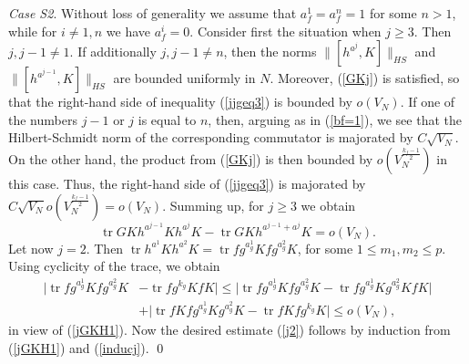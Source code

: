 \documentclass{article}
\numberwithin{equation}{section}
\newcommand{\tr}{\operatorname{tr}}
\newcommand{\fr}{\frac}
\newcommand{\lbl}{\label}
\newcommand{\bee}{\begin{equation}}
\newcommand{\eee}{\end{equation}}
\newcommand{\non}{\nonumber}
\begin{document}
{\it Case S2}.
Without loss of generality we assume that
$a_f^1=a_f^n=1$ for some $n>1$, while for $i\neq 1,n$ we have $a_f^i=0$.
Consider first the situation when $j\geq 3$. Then $j,j-1\neq 1$.
If additionally $j,j-1\neq n$, then the norms
$\|[h^{a^{j}},K]\|_{HS}$ and $\|[h^{a^{j-1}},K]\|_{HS}$
are bounded uniformly in $N$.
Moreover, (\ref{GKj}) is satisfied, so that the right-hand side of inequality (\ref{jjgeq3})
is bounded by $o(V_N)$.
If one of the numbers $j-1$ or $j$ is equal to $n$,
then, arguing as in (\ref{bf=1}),
we see that
the Hilbert-Schmidt norm of the corresponding commutator
is majorated by $C\sqrt{V_N}$.
On the other hand, the product from
(\ref{GKj}) is then bounded by $o(V_N^{\fr{k_f-1}{2}})$ in this case.
Thus, the right-hand side of  (\ref{jjgeq3})
is majorated by
$C\sqrt{V_N} o(V_N^{\fr{k_f-1}{2}})
=o(V_N).$
Summing up, for $j\geq 3$ we obtain
\bee\lbl{jGKH1}
\tr GK h^{a^{j-1}}K h^{a^j}K -\tr GK h^{a^{j-1}+a^j} K
=o(V_N).
\eee
Let now $j=2$.
Then
$\tr h^{a^1}K h^{a^2}K= \tr fg^{a_g^1}K fg^{a_g^2}K$,
for some $1\leq m_1,m_2\leq p$.
Using cyclicity of the trace, we obtain
\begin{align} \non
\big| \tr fg^{a_g^1}K fg^{a_g^2}K &- \tr fg^{k_g}K fK\big|
\leq \big| \tr fg^{a_g^1}K fg^{a_g^2}K
 - \tr fg^{a_g^1}K g^{a_g^2}K fK\big|
\\ \lbl{inducj}
&+ \big| \tr fK fg^{a_g^1}K  g^{a_g^2}K  -
\tr fK fg^{k_g}K \big|
\leq o(V_N),
\end{align}
in view of (\ref{jGKH1}). Now the desired estimate (\ref{j2}) follows by induction
from (\ref{jGKH1}) and (\ref{inducj}).
\qed
\end{document}
